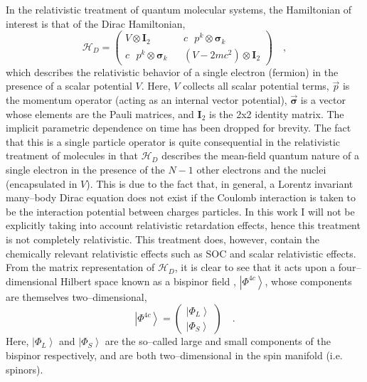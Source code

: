 \documentclass[12pt]{article}
\newcommand{\ket}[1]{\left\vert #1 \right\rangle}         %
\newcommand*\vc[1]{\boldsymbol{#1}}
\newcommand*\op[1]{\mathcal{#1}}
\begin{document}
In the relativistic treatment of quantum molecular systems, the Hamiltonian
of interest is that of the Dirac Hamiltonian,
\begin{equation}
\op{H}_D = 
\begin{pmatrix}
  V \otimes \vc{I}_2 && c \text { } p^k \otimes \vc{\sigma}_k \\
  c \text { } p^k \otimes \vc{\sigma}_k && (V - 2mc^2) \otimes \vc{I}_2
\end{pmatrix} \quad ,
\label{eq:DiracHam}
\end{equation}
which describes the relativistic behavior of a single electron (fermion) in the
presence of a scalar potential $V$. Here, $V$ collects all scalar potential
terms, $\vec{p}$ is the momentum operator (acting as an internal vector
potential), $\vec{\vc{\sigma}}$ is a vector whose elements are the Pauli
matrices, and $\vc{I}_2$ is the 2x2 identity matrix. The implicit parametric
dependence on time has been dropped for brevity. The fact that this is a single
particle operator is quite consequential in the relativistic treatment of
molecules in that $\op{H}_D$ describes the mean-field quantum nature of a
single electron in the presence of the $N-1$ other electrons and the nuclei
(encapsulated in $V$). This is due to the fact that, in general, a Lorentz
invariant many--body Dirac equation does not exist if the Coulomb interaction is
taken to be the interaction potential between charges particles. In this work I
will not be explicitly taking into account relativistic retardation effects,
hence this treatment is not completely relativistic. This treatment does,
however, contain the chemically relevant relativistic effects such as
SOC and  scalar relativistic effects.
From the matrix representation of $\op{H}_D$, it is clear to see that it
acts upon a four--dimensional Hilbert space known as a bispinor field ,
$\ket{\Phi^{4c}}$, whose components are themselves two--dimensional,
\begin{equation}
\ket{\Phi^{4c}} = \begin{pmatrix}
 \ket{\Phi_L} \\ \ket{\Phi_S}
\end{pmatrix} \quad.
\end{equation}
Here, $\ket{\Phi_L}$ and $\ket{\Phi_S}$ are the so--called large and small
components of the bispinor respectively, and are both two--dimensional in the
spin manifold (i.e. spinors).
\end{document}
